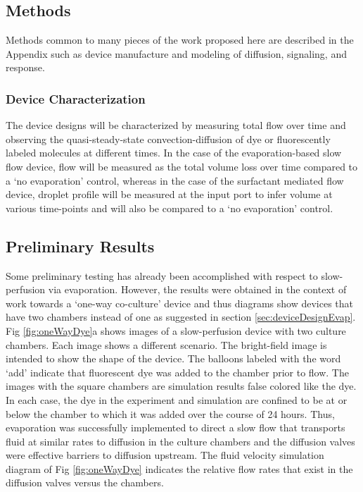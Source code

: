 \subsection{Methods}

Methods common to many pieces of the work proposed here are described in the Appendix such as device manufacture and modeling of diffusion, signaling, and response.

\subsubsection{Device Characterization}
The device designs will be characterized by measuring total flow over time and observing the quasi-steady-state convection-diffusion of dye or fluorescently labeled molecules at different times. In the case of the evaporation-based slow flow device, flow will be measured as the total volume loss over time compared to a `no evaporation' control, whereas in the case of the surfactant mediated flow device, droplet profile will be measured at the input port to infer volume at various time-points and will also be compared to a `no evaporation' control.

\subsection{Preliminary Results} \label{sec:prelimCCResults}

Some preliminary testing has already been accomplished with respect to slow-perfusion via evaporation. However, the results were obtained in the context of work towards a `one-way co-culture' device and thus diagrams show devices that have two chambers instead of one as suggested in section \ref{sec:deviceDesignEvap}. Fig \ref{fig:oneWayDye}a shows images of a slow-perfusion device with two culture chambers. Each image shows a different scenario. The bright-field image is intended to show the shape of the device. The balloons labeled with the word `add' indicate that fluorescent dye was added to the chamber prior to flow. The images with the square chambers are simulation results false colored like the dye. In each case, the dye in the experiment and simulation are confined to be at or below the chamber to which it was added over the course of 24 hours. Thus, evaporation was successfully implemented to direct a slow flow that transports fluid at similar rates to diffusion in the culture chambers and the diffusion valves were effective barriers to diffusion upstream. The fluid velocity simulation diagram of Fig \ref{fig:oneWayDye} indicates the relative flow rates that exist in the diffusion valves versus the chambers.

